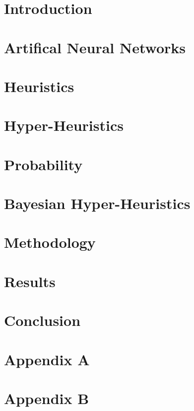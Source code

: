 \documentclass[preprint,review,12pt]{elsarticle}
\begin{document}
\section{Introduction}
\label{sec:introduction}

\section{Artifical Neural Networks}
\label{sec:anns}

\section{Heuristics}
\label{sec:heuristics}

\section{Hyper-Heuristics}
\label{sec:hhs}

\section{Probability}
\label{sec:probability}

\section{Bayesian Hyper-Heuristics}
\label{sec:bhh}

\section{Methodology}
\label{sec:methodology}

\section{Results}
\label{sec:results}

\section{Conclusion}
\label{sec:conclusion}

\appendix

\section{Appendix A}
\label{app:appendix_a}

\section{Appendix B}
\label{app:appendix_b}
\end{document}
